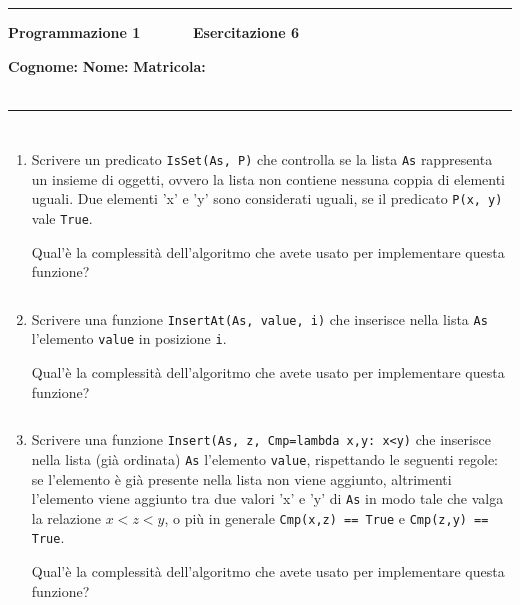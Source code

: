 \documentclass[11pt,a4]{article}
\newcommand{\mybox}[2]{$\quad$\fbox{
\begin{minipage}{#1cm}
\hfill\vspace{#2cm}
\end{minipage}
}}
\begin{document}
\thispagestyle{empty}
\hrule
\begin{center}
   {\Large {\bf Programmazione 1 \hspace{3cm} $\quad \quad \quad$ Esercitazione 6}}
\end{center}
{\bf Cognome: }\hspace{2.5cm} {\bf Nome: } \hspace{2.5cm} {\bf Matricola: } \\\
\hrule

\section*{}

\begin{enumerate}

\item Scrivere un predicato {\tt IsSet(As, P)} che controlla se la lista {\tt As} rappresenta
un insieme di oggetti, ovvero la lista non contiene nessuna coppia di elementi uguali. Due elementi 'x' e 'y'
sono considerati uguali, se il predicato {\tt P(x, y)} vale {\tt True}.

Qual'è la complessità dell'algoritmo che avete usato per implementare questa funzione?

\mybox{15}{2.75}

\item Scrivere una funzione {\tt InsertAt(As, value, i)} che inserisce nella lista {\tt As} l'elemento {\tt value}
in posizione {\tt i}.

Qual'è la complessità dell'algoritmo che avete usato per implementare questa funzione?

\mybox{15}{2.75}

\item Scrivere una funzione {\tt Insert(As, z, Cmp=lambda x,y: x<y)} che inserisce nella lista (già ordinata)
{\tt As} l'elemento {\tt value},
rispettando le seguenti regole: se l'elemento è già presente nella lista non viene aggiunto,
altrimenti l'elemento viene aggiunto tra due valori 'x' e 'y' di {\tt As} in modo tale che 
valga la relazione $x < z < y$, o più in generale {\tt Cmp(x,z) == True} e {\tt Cmp(z,y) == True}.

Qual'è la complessità dell'algoritmo che avete usato per implementare questa funzione?


\end{enumerate}
\end{document}
